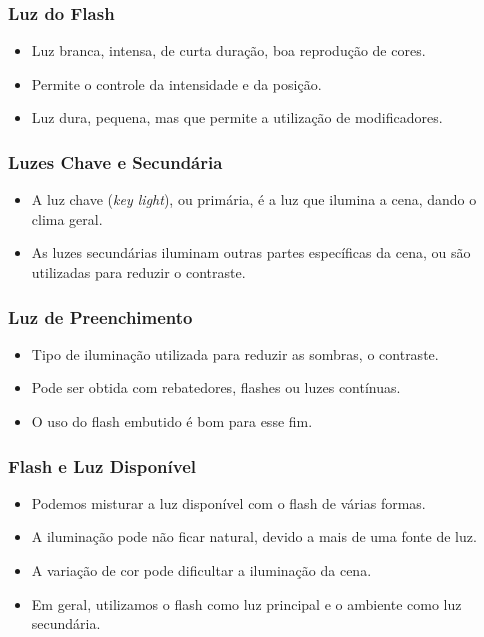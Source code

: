 \begin{frame}
  \frametitle{Luz do Flash}
  \begin{itemize}
      \item Luz branca, intensa, de curta duração, boa reprodução de cores.
      \item Permite o controle da intensidade e da posição.
      \item Luz dura, pequena, mas que permite a utilização de modificadores.
  \end{itemize}
\end{frame}


\begin{frame}
  \frametitle{Luzes Chave e Secundária}
  \begin{itemize}
      \item A luz chave (\textit{key light}), ou primária, é a luz que ilumina a cena,
      dando o clima geral.
      \item As luzes secundárias iluminam outras partes específicas da cena, ou são
      utilizadas para reduzir o contraste.
  \end{itemize}
\end{frame}


\begin{frame}
  \frametitle{Luz de Preenchimento}
  \begin{itemize}
      \item Tipo de iluminação utilizada para reduzir as sombras, o contraste.
      \item Pode ser obtida com rebatedores, flashes ou luzes contínuas.
      \item O uso do flash embutido é bom para esse fim.
  \end{itemize}
\end{frame}


\begin{frame}
  \frametitle{Flash e Luz Disponível}
  \begin{itemize}
      \item Podemos misturar a luz disponível com o flash de várias formas.
      \item A iluminação pode não ficar natural, devido a mais de uma fonte de luz.
      \item A variação de cor pode dificultar a iluminação da cena.
      \item Em geral, utilizamos o flash como luz principal e o ambiente como
      luz secundária.
  \end{itemize}
\end{frame}

